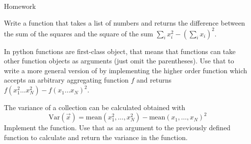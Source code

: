 \documentclass[a4paper, draft=False]{scrartcl}
\begin{document}
\begin{exam}[Homework]{Homework}
\begin{problem*}[\auto]
        \begin{parts}
        \item{} Write a function  that takes a list
          of numbers and returns the difference between the sum of the squares and
          the square of the sum $\sum_i x_i^2 - \left(\sum_i x_i\right)^2$.
        \item{} In python functions are first-class object, that means
          that functions can take other function objects as arguments (just omit
          the parentheses). Use that to write a more general version of
           by implementing the higher order function
           which accepts an arbitrary aggregating
          function $f$ and returns $f(x_1^2\ldots x_N^2) - f(x_1\ldots x_N)^2$.
        \item{} The variance of a collection can be calculated obtained with
          \begin{equation*}
            \mathrm{Var}(\vec{x}) = \mathrm{mean}(x_1^2, \ldots, x_N^2) -
            \mathrm{mean}(x_1, \ldots,  x_N)^2
          \end{equation*}
          Implement the  function. Use that as an argument to the previously defined
           function to calculate and return the variance
          in the  function.
        \end{parts}
      \end{problem*}
    \end{exam}

  
\end{document}
